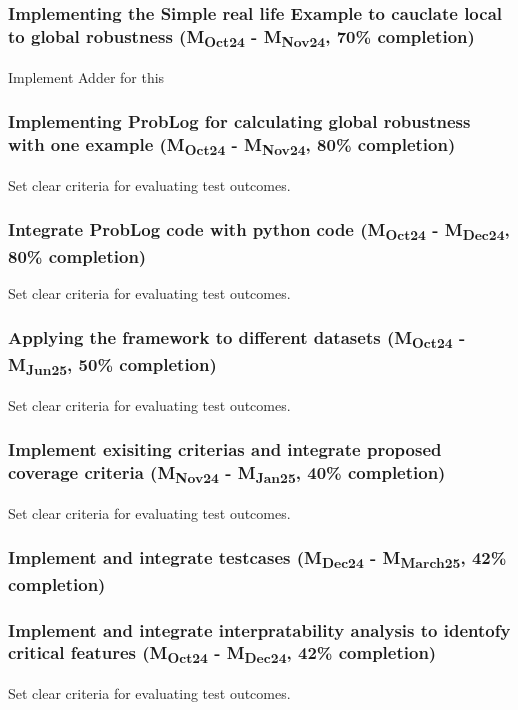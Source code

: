 \subsubsection{Implementing the Simple real life Example to cauclate local to global robustness (M\textsubscript{Oct24} - M\textsubscript{Nov24}, 70\% completion)}
Implement Adder for this

\subsubsection{Implementing ProbLog for  calculating global robustness with one example  (M\textsubscript{Oct24} - M\textsubscript{Nov24}, 80\% completion)}
Set clear criteria for evaluating test outcomes.

\subsubsection{Integrate ProbLog code with python code (M\textsubscript{Oct24} - M\textsubscript{Dec24}, 80\% completion)}
Set clear criteria for evaluating test outcomes.
\subsubsection{Applying the framework to different datasets (M\textsubscript{Oct24} - M\textsubscript{Jun25}, 50\% completion)}
Set clear criteria for evaluating test outcomes.

\subsubsection{Implement exisiting criterias and integrate proposed coverage criteria 
(M\textsubscript{Nov24} - M\textsubscript{Jan25}, 40\% completion)}
Set clear criteria for evaluating test outcomes.

\subsubsection{Implement and integrate testcases (M\textsubscript{Dec24} - M\textsubscript{March25}, 42\% completion)}

\subsubsection{ Implement and integrate interpratability analysis to identofy critical features (M\textsubscript{Oct24} - M\textsubscript{Dec24}, 42\% completion)}
Set clear criteria for evaluating test outcomes.
